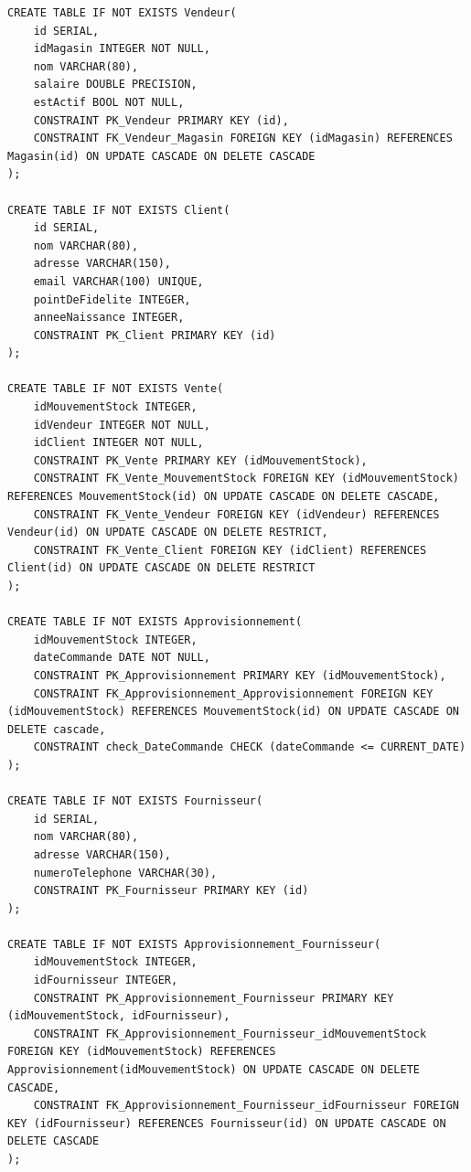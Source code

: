 \documentclass[12pt]{report}
\begin{document}
\begin{lstlisting}[breaklines=true]
CREATE TABLE IF NOT EXISTS Vendeur(
    id SERIAL,
    idMagasin INTEGER NOT NULL,
    nom VARCHAR(80),
    salaire DOUBLE PRECISION,
    estActif BOOL NOT NULL,
    CONSTRAINT PK_Vendeur PRIMARY KEY (id),
    CONSTRAINT FK_Vendeur_Magasin FOREIGN KEY (idMagasin) REFERENCES Magasin(id) ON UPDATE CASCADE ON DELETE CASCADE
);

CREATE TABLE IF NOT EXISTS Client(
    id SERIAL,
    nom VARCHAR(80),
    adresse VARCHAR(150),
    email VARCHAR(100) UNIQUE,
    pointDeFidelite INTEGER,
    anneeNaissance INTEGER,
    CONSTRAINT PK_Client PRIMARY KEY (id)
);

CREATE TABLE IF NOT EXISTS Vente(
    idMouvementStock INTEGER,
    idVendeur INTEGER NOT NULL,
    idClient INTEGER NOT NULL,
    CONSTRAINT PK_Vente PRIMARY KEY (idMouvementStock),
    CONSTRAINT FK_Vente_MouvementStock FOREIGN KEY (idMouvementStock) REFERENCES MouvementStock(id) ON UPDATE CASCADE ON DELETE CASCADE,
    CONSTRAINT FK_Vente_Vendeur FOREIGN KEY (idVendeur) REFERENCES Vendeur(id) ON UPDATE CASCADE ON DELETE RESTRICT,
    CONSTRAINT FK_Vente_Client FOREIGN KEY (idClient) REFERENCES Client(id) ON UPDATE CASCADE ON DELETE RESTRICT
);

CREATE TABLE IF NOT EXISTS Approvisionnement(
    idMouvementStock INTEGER,
    dateCommande DATE NOT NULL,
    CONSTRAINT PK_Approvisionnement PRIMARY KEY (idMouvementStock),
    CONSTRAINT FK_Approvisionnement_Approvisionnement FOREIGN KEY (idMouvementStock) REFERENCES MouvementStock(id) ON UPDATE CASCADE ON DELETE cascade,
    CONSTRAINT check_DateCommande CHECK (dateCommande <= CURRENT_DATE)
);

CREATE TABLE IF NOT EXISTS Fournisseur(
    id SERIAL,
    nom VARCHAR(80),
    adresse VARCHAR(150),
    numeroTelephone VARCHAR(30),
    CONSTRAINT PK_Fournisseur PRIMARY KEY (id)
);

CREATE TABLE IF NOT EXISTS Approvisionnement_Fournisseur(
    idMouvementStock INTEGER,
    idFournisseur INTEGER,
    CONSTRAINT PK_Approvisionnement_Fournisseur PRIMARY KEY (idMouvementStock, idFournisseur),
    CONSTRAINT FK_Approvisionnement_Fournisseur_idMouvementStock FOREIGN KEY (idMouvementStock) REFERENCES Approvisionnement(idMouvementStock) ON UPDATE CASCADE ON DELETE CASCADE,
    CONSTRAINT FK_Approvisionnement_Fournisseur_idFournisseur FOREIGN KEY (idFournisseur) REFERENCES Fournisseur(id) ON UPDATE CASCADE ON DELETE CASCADE
);
    \end{lstlisting}

\end{document}
